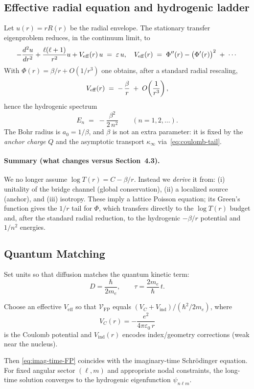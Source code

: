 \documentclass[11pt]{article}
\theoremstyle{plain}
\theoremstyle{definition}
\begin{document}
\subsection{Effective radial equation and hydrogenic ladder}
Let $u(r)=rR(r)$ be the radial envelope. The stationary transfer eigenproblem reduces, in the continuum limit, to
\[
  -\frac{d^2u}{dr^2} + \frac{\ell(\ell+1)}{r^2} u + V_{\rm eff}(r)\,u \;=\; \varepsilon\,u,
  \quad
  V_{\rm eff}(r)\;=\; \Phi''(r) - \big(\Phi'(r)\big)^2 \;+\; \cdots
\]
With $\Phi(r)= \beta/r + O(1/r^3)$ one obtains, after a standard radial rescaling,
\[
  V_{\rm eff}(r) \;=\; -\,\frac{\beta}{r} \;+\; O\!\left(\frac{1}{r^3}\right),
\]
hence the hydrogenic spectrum
\[
  E_n \;=\; -\frac{\beta^2}{2\,n^2} \qquad (n=1,2,\ldots).
\]
The Bohr radius is $a_0=1/\beta$, and \(\beta\) is not an extra parameter: it is fixed by the \emph{anchor charge} \(Q\) and the asymptotic transport \(\kappa_\infty\) via~\eqref{eq:coulomb-tail}.

\paragraph{Summary (what changes versus Section~4.3).}
We no longer assume $\log T(r)=C-\beta/r$.
Instead we \emph{derive} it from: (i) unitality of the bridge channel (global conservation), (ii) a localized source (anchor), and (iii) isotropy.
These imply a lattice Poisson equation; its Green’s function gives the $1/r$ tail for $\Phi$, which transfers directly to the \(\log T(r)\) budget and, after the standard radial reduction, to the hydrogenic \(-\beta/r\) potential and \(1/n^2\) energies.

\subsection{Quantum Matching}

Set units so that diffusion matches the quantum kinetic term:
\[
  D = \frac{\hbar}{2 m_e}, \qquad \tau = \frac{2 m_e}{\hbar}\, t.
\]

Choose an effective $V_{\mathrm{eff}}$ so that $\mathcal{V}_{\mathrm{FP}}$ equals $(V_C+V_{\mathrm{ind}})/(\hbar^2/2m_e)$, where
\[
  V_C(r) = -\frac{e^2}{4\pi\varepsilon_0\, r}
\]
is the Coulomb potential and $V_{\mathrm{ind}}(r)$ encodes index/geometry corrections (weak near the nucleus).

Then \eqref{eq:imag-time-FP} coincides with the imaginary-time Schrödinger equation. For fixed angular sector $(\ell,m)$ and appropriate nodal constraints, the long-time solution converges to the hydrogenic eigenfunction $\psi_{n\ell m}$.
\end{document}
